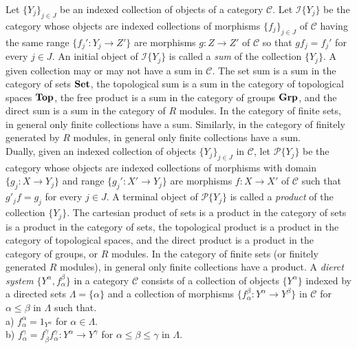 \documentclass{article}
\begin{document}
Let $\{Y_j\}_{j \in J}$ be an indexed collection of objects of a category $\mathscr{C}$. Let $\mathscr{I}\{Y_j\}$ be the category whose objects are indexed collections of morphisms $\{f_j\}_{j \in J}$ of $\mathscr{C}$ having the same range $\{f_j' : Y_j \to Z'\}$ are morphisms $g : Z \to Z'$ of $\mathscr{C}$ so that $gf_j = f_j'$ for every $j \in J$. An initial object of $\mathscr{I}\{Y_j\}$ is called a \emph{sum} of the collection $\{Y_j\}$. A given collection may or may not have a sum in $\mathscr{C}$. The set sum is a sum in the category of sets $\bold{Set}$, the topological sum is a sum in the category of topological spaces $\bold{Top}$, the free product is a sum in the category of groups $\bold{Grp}$, and the direct sum is a sum in the category of $R$ modules. In the category of finite sets, in general only finite collections have a sum. Similarly, in the category of finitely generated by $R$ modules, in general only finite collections have a sum.\\
Dually, given an indexed collection of objects $\{Y_j\}_{j \in J}$ in $\mathscr{C}$, let $\mathscr{P}\{Y_j\}$ be the category whose objects are indexed collections of morphisms with domain $\{g_j : X \to Y_j\}$ and range $\{g_j' : X' \to Y_j\}$ are morphisms $f : X \to X'$ of $\mathscr{C}$ such that $g'_j f = g_j$ for every $j \in J$. A terminal object of $\mathscr{P}\{Y_j\}$ is called a \emph{product} of the collection $\{Y_j\}$. The cartesian product of sets is a product in the category of sets is a product in the category of sets, the topological product is a product in the category of topological spaces, and the direct product is a product in the category of groups, or $R$ modules. In the category of finite sets (or finitely generated $R$ modules), in general only finite collections have a product.
A \emph{dierct system} $\{Y^\alpha,f_\alpha^\beta\}$ in a category $\mathscr{C}$ consists of a collection of objects $\{Y^\alpha\}$ indexed by a directed sets $\Lambda = \{\alpha\}$ and a collection of morphisms $\{f_\alpha^\beta : Y^\alpha \to Y^\beta\}$ in $\mathscr{C}$ for $\alpha\leq \beta$ in $\Lambda$ such that.\\
a) $f_\alpha^\alpha = 1_{Y^\alpha}$ for $\alpha \in \Lambda$.\\
b) $f_\alpha^\gamma = f_\beta^\gamma f_\alpha^\gamma : Y^\alpha \to Y^\gamma$ for $\alpha \leq \beta \leq \gamma$ in $\Lambda$.
\end{document}
